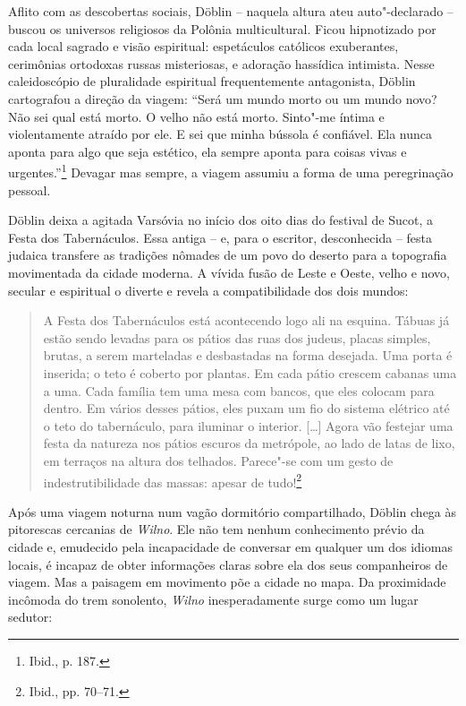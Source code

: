 Aflito com as descobertas sociais, Döblin -- naquela altura ateu
auto"-declarado -- buscou os universos religiosos da Polônia
multicultural. Ficou hipnotizado por cada local sagrado e visão
espiritual: espetáculos católicos exuberantes, cerimônias ortodoxas
russas misteriosas, e adoração hassídica intimista. Nesse caleidoscópio
de pluralidade espiritual frequentemente antagonista, Döblin cartografou
a direção da viagem: ``Será um mundo morto ou um mundo novo? Não sei
qual está morto. O velho não está morto. Sinto"-me íntima e violentamente
atraído por ele. E sei que minha bússola é confiável. Ela nunca aponta
para algo que seja estético, ela sempre aponta para coisas vivas e
urgentes.''\footnote{Ibid., p. 187.} Devagar mas sempre, a viagem
assumiu a forma de uma peregrinação pessoal.

Döblin deixa a agitada Varsóvia no início dos oito dias do festival de
Sucot, a Festa dos Tabernáculos. Essa antiga -- e, para o escritor,
desconhecida -- festa judaica transfere as tradições nômades de um povo do
deserto para a topografia movimentada da cidade moderna. A vívida fusão
de Leste e Oeste, velho e novo, secular e espiritual o diverte e
revela a compatibilidade dos dois mundos:

\begin{quote}
A Festa dos Tabernáculos está acontecendo logo ali na esquina. Tábuas já
estão sendo levadas para os pátios das ruas dos judeus, placas simples,
brutas, a serem marteladas e desbastadas na forma desejada. Uma porta é
inserida; o teto é coberto por plantas. Em cada pátio crescem cabanas
uma a uma. Cada família tem uma mesa com bancos, que eles colocam para
dentro. Em vários desses pátios, eles puxam um fio do sistema elétrico
até o teto do tabernáculo, para iluminar o interior. [\ldots{}] Agora vão
festejar uma festa da natureza nos pátios escuros da metrópole, ao lado
de latas de lixo, em terraços na altura dos telhados. Parece"-se com um
gesto de indestrutibilidade das massas: apesar de tudo!\footnote{Ibid., pp. 70--71.} 
\end{quote}

Após uma viagem noturna num vagão dormitório compartilhado, Döblin chega
às pitorescas cercanias de \textit{Wilno}. Ele não tem nenhum conhecimento prévio
da cidade e, emudecido pela incapacidade de conversar em qualquer um dos
idiomas locais, é incapaz de obter informações claras sobre ela dos seus
companheiros de viagem. Mas a paisagem em movimento põe a cidade no
mapa. Da proximidade incômoda do trem sonolento, \textit{Wilno} inesperadamente
surge como um lugar sedutor:

